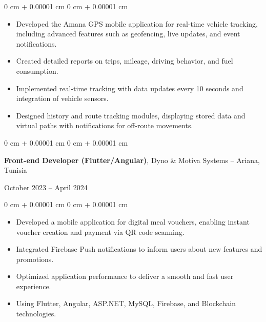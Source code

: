 \documentclass[10pt, letterpaper]{article}
\newenvironment{highlights}{
    \begin{itemize}[
        topsep=0.10 cm,
        parsep=0.10 cm,
        partopsep=0pt,
        itemsep=0pt,
        leftmargin=0 cm + 10pt
    ]
}{
    \end{itemize}
} %
\newenvironment{onecolentry}{
    \begin{adjustwidth}{
        0 cm + 0.00001 cm
    }{
        0 cm + 0.00001 cm
    }
}{
    \end{adjustwidth}
} %
\newenvironment{twocolentry}[2][]{
    \onecolentry
    \def\secondColumn{#2}
    \setcolumnwidth{\fill, 4.5 cm}
    \begin{paracol}{2}
}{
    \switchcolumn \raggedleft \secondColumn
    \end{paracol}
    \endonecolentry
} %
\begin{document}
        \vspace{0.10 cm}
        \begin{onecolentry}
            \begin{highlights}
                \item Developed the Amana GPS mobile application for real-time vehicle tracking, including advanced features such as geofencing, live updates, and event notifications.
                \item Created detailed reports on trips, mileage, driving behavior, and fuel consumption.
                \item Implemented real-time tracking with data updates every 10 seconds and integration of vehicle sensors.
                \item Designed history and route tracking modules, displaying stored data and virtual paths with notifications for off-route movements.
            \end{highlights}
        \end{onecolentry}
        
        \vspace{0.2 cm}
        
        \begin{twocolentry}{
            October 2023 – April 2024
        }
        
            \textbf{Front-end Developer (Flutter/Angular)}, Dyno \& Motiva Systems -- Ariana, Tunisia
            
        \end{twocolentry}
        
        \vspace{0.10 cm}
        \begin{onecolentry}
            \begin{highlights}
                \item Developed a mobile application for digital meal vouchers, enabling instant voucher creation and payment via QR code scanning.
                \item Integrated Firebase Push notifications to inform users about new features and promotions.
                \item Optimized application performance to deliver a smooth and fast user experience.
                \item Using Flutter, Angular, ASP.NET, MySQL, Firebase, and Blockchain technologies.
            \end{highlights}
        \end{onecolentry}
        
\end{document}
